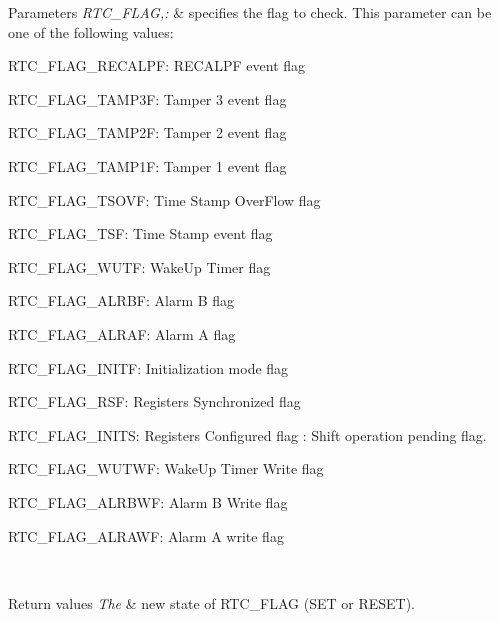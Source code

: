 \begin{DoxyParams}{Parameters}
{\em R\-T\-C\-\_\-\-F\-L\-A\-G,\-:} & specifies the flag to check. This parameter can be one of the following values\-: \begin{DoxyItemize}
\item R\-T\-C\-\_\-\-F\-L\-A\-G\-\_\-\-R\-E\-C\-A\-L\-P\-F\-: R\-E\-C\-A\-L\-P\-F event flag \item R\-T\-C\-\_\-\-F\-L\-A\-G\-\_\-\-T\-A\-M\-P3\-F\-: Tamper 3 event flag \item R\-T\-C\-\_\-\-F\-L\-A\-G\-\_\-\-T\-A\-M\-P2\-F\-: Tamper 2 event flag \item R\-T\-C\-\_\-\-F\-L\-A\-G\-\_\-\-T\-A\-M\-P1\-F\-: Tamper 1 event flag \item R\-T\-C\-\_\-\-F\-L\-A\-G\-\_\-\-T\-S\-O\-V\-F\-: Time Stamp Over\-Flow flag \item R\-T\-C\-\_\-\-F\-L\-A\-G\-\_\-\-T\-S\-F\-: Time Stamp event flag \item R\-T\-C\-\_\-\-F\-L\-A\-G\-\_\-\-W\-U\-T\-F\-: Wake\-Up Timer flag \item R\-T\-C\-\_\-\-F\-L\-A\-G\-\_\-\-A\-L\-R\-B\-F\-: Alarm B flag \item R\-T\-C\-\_\-\-F\-L\-A\-G\-\_\-\-A\-L\-R\-A\-F\-: Alarm A flag \item R\-T\-C\-\_\-\-F\-L\-A\-G\-\_\-\-I\-N\-I\-T\-F\-: Initialization mode flag \item R\-T\-C\-\_\-\-F\-L\-A\-G\-\_\-\-R\-S\-F\-: Registers Synchronized flag \item R\-T\-C\-\_\-\-F\-L\-A\-G\-\_\-\-I\-N\-I\-T\-S\-: Registers Configured flag  \-: Shift operation pending flag. \item R\-T\-C\-\_\-\-F\-L\-A\-G\-\_\-\-W\-U\-T\-W\-F\-: Wake\-Up Timer Write flag \item R\-T\-C\-\_\-\-F\-L\-A\-G\-\_\-\-A\-L\-R\-B\-W\-F\-: Alarm B Write flag \item R\-T\-C\-\_\-\-F\-L\-A\-G\-\_\-\-A\-L\-R\-A\-W\-F\-: Alarm A write flag \end{DoxyItemize}
\\
\hline
\end{DoxyParams}

\begin{DoxyRetVals}{Return values}
{\em The} & new state of R\-T\-C\-\_\-\-F\-L\-A\-G (S\-E\-T or R\-E\-S\-E\-T).\\
\hline
\end{DoxyRetVals}

